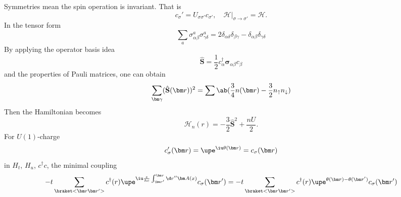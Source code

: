 Symmetries mean the spin operation is invariant. That is
\[
  c_\sigma' = U_{\sigma\sigma'} c_{\sigma'},
  \quad \mathcal H\big|_{\sigma\to\sigma'} = \mathcal H.
\]
In the tensor form
\[
  \sum_a \sigma_{\alpha\beta}^a \sigma_{\gamma\delta}^a
= 2\delta_{\alpha\delta} \delta_{\beta\gamma}
- \delta_{\alpha\beta} \delta_{\gamma\delta}
\]
By applying the operator basis idea
\[
  \hat {\mathbf S} = \frac12 c_\alpha^\dagger \bm\sigma_{\alpha\beta} c_\beta
\]
and the properties of Pauli matrices, one can obtain
\begin{equation}
  \sum_{\bm\gamma} (\hat {\mathbf S} (\bm r))^2
= \sum\ab(\frac34 n(\bm r) - \frac32 n_\uparrow n_\downarrow)
\end{equation}
Then the Hamiltonian becomes
\begin{equation}
  \mathcal H_n(r) = -\frac32 \hat {\mathbf S}^2 + \frac{nU}{2}.
\end{equation}
For $U(1)$-charge
\[
  c_\sigma'(\bm r) = \upe^{\iu\theta(\bm r)} = c_\sigma(\bm r)
\]
in $H_t$, $H_u$, $c^\dagger c$, the minimal coupling
\[
  -t\sum_{\braket<\bm r\bm r'>} c^\dagger(r)
  \upe^{\iu\frac{e}{hc}\int_{\bm r'}^{\bm r}\d r'' \bm A(x)} c_\sigma(\bm r')
= -t\sum_{\braket<\bm r\bm r'>} c^\dagger(r)
  \upe^{\theta(\bm r) - \theta(\bm r')} c_\sigma(\bm r')
\]
